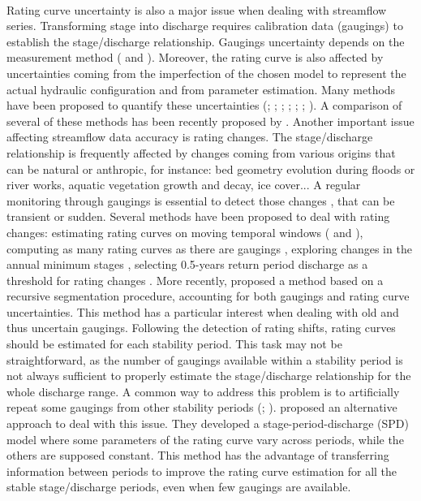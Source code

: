 \documentclass[11pt]{article}
\begin{document}
    \paragraph{}
    Rating curve uncertainty is also a major issue when dealing with streamflow series. Transforming stage into discharge requires calibration data (gaugings) to establish the stage/discharge relationship. Gaugings uncertainty depends on the measurement method (\citet{lecoz_quantification_2014} and \citet{puechberty_charte_2017}). Moreover, the rating curve is also affected by uncertainties coming from the imperfection of the chosen model to represent the actual hydraulic configuration and from parameter estimation. Many methods have been proposed to quantify these uncertainties (\citet{petersen-overleir_bayesian_2009}; \citet{juston_rating_2014}; \citet{le_coz_combining_2014}; \citet{morlot_dynamic_2014}; \citet{coxon_novel_2015}; \citet{mcmillan_rating_2015}; \citet{mansanarez_rapid_2019}). A comparison of several of these methods has been recently proposed by \citet{kiang_comparison_2018}. Another important issue affecting streamflow data accuracy is rating changes. The stage/discharge relationship is frequently affected by changes coming from various origins that can be natural or anthropic, for instance: bed geometry evolution during floods or river works, aquatic vegetation growth and decay, ice cover... A regular monitoring through gaugings is essential to detect those changes \citep{ibbitt_gauging_1987}, that can be transient or sudden. Several methods have been proposed to deal with rating changes: estimating rating curves on moving temporal windows (\citet{westerberg_stage-discharge_2011} and \citet{guerrero_temporal_2012}), computing as many rating curves as there are gaugings \citep{morlot_dynamic_2014}, exploring changes in the annual minimum stages \citep{lapuszek_methods_2015}, selecting 0.5-years return period discharge as a threshold for rating changes \citep{mcmillan_impacts_2010}. More recently, \citet{darienzo_detection_2021} proposed a method based on a recursive segmentation procedure, accounting for both gaugings and rating curve uncertainties. This method has a particular interest when dealing with old and thus uncertain gaugings. Following the detection of rating shifts, rating curves should be estimated for each stability period. This task may not be straightforward, as the number of gaugings available within a stability period is not always sufficient to properly estimate the stage/discharge relationship for the whole discharge range. A common way to address this problem is to artificially repeat some gaugings from other stability periods (\citet{mcmillan_benchmarking_2012}; \citet{puechberty_charte_2017}). \citet{mansanarez_shift_2019} proposed an alternative approach to deal with this issue. They developed a stage-period-discharge (SPD) model where some parameters of the rating curve vary across periods, while the others are supposed constant. This method has the advantage of transferring information between periods to improve the rating curve estimation for all the stable stage/discharge periods, even when few gaugings are available.
\end{document}

